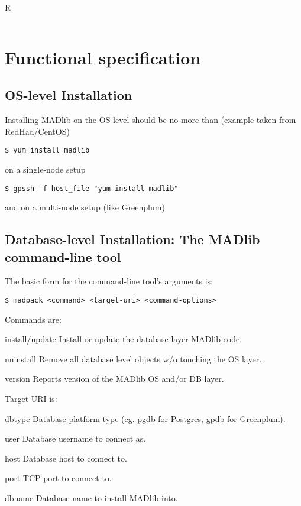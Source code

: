 \documentclass[11pt]{article}
\begin{document}
{\begin{mlreq}{R}
\begin{tabular}{|l|p{133mm}|}
\end{tabular}
\end{mlreq}

\ifx\pdfoutput\undefined %
\else
{}
\fi

\section{Functional specification}

\subsection{OS-level Installation}

	Installing MADlib on the OS-level should be no more than (example taken from RedHad/CentOS)
	\begin{lstlisting}
$ yum install madlib
	\end{lstlisting}
	on a single-node setup
	\begin{lstlisting}
$ gpssh -f host_file "yum install madlib"
	\end{lstlisting}
	and on a multi-node setup (like Greenplum)

\subsection{Database-level Installation: The MADlib command-line tool}


	The basic form for the command-line tool's arguments is:

	\begin{lstlisting}
$ madpack <command> <target-uri> <command-options>
	\end{lstlisting}

\begin{description}
	\item Commands are:
	\begin{ttdescription}
		\item[install/update] Install or update the database layer MADlib code.
		\item[uninstall] Remove all database level objects w/o touching the OS layer.
		\item[version] Reports version of the MADlib OS and/or DB layer. 
	\end{ttdescription}

	\item Target URI is: 
	\begin{ttdescription}
		\item[dbtype] Database platform type (eg. pgdb for Postgres, gpdb for Greenplum). 
		\item[user] Database username to connect as.
		\item[host] Database host to connect to.
		\item[port] TCP port to connect to.
		\item[dbname] Database name to install MADlib into.
	\end{ttdescription}
	

\end{description}}
\end{document}
